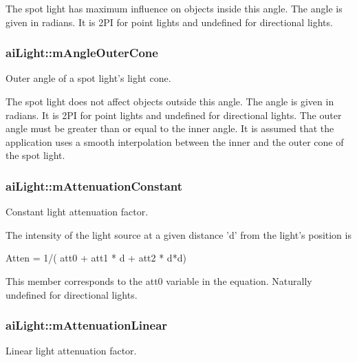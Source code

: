 The spot light has maximum influence on objects inside this angle. The angle is given in radians. It is 2\-P\-I for point lights and undefined for directional lights. \hypertarget{structai_light_a20fd332a5f9d8e8cb94816ff2b0ae7f4}{
\subsubsection[{m\-Angle\-Outer\-Cone}]{ ai\-Light\-::m\-Angle\-Outer\-Cone}}\label{structai_light_a20fd332a5f9d8e8cb94816ff2b0ae7f4}
Outer angle of a spot light's light cone.

The spot light does not affect objects outside this angle. The angle is given in radians. It is 2\-P\-I for point lights and undefined for directional lights. The outer angle must be greater than or equal to the inner angle. It is assumed that the application uses a smooth interpolation between the inner and the outer cone of the spot light. \hypertarget{structai_light_ae8804b3c309527ca0f85d676bab55710}{
\subsubsection[{m\-Attenuation\-Constant}]{ ai\-Light\-::m\-Attenuation\-Constant}}\label{structai_light_ae8804b3c309527ca0f85d676bab55710}
Constant light attenuation factor.

The intensity of the light source at a given distance 'd' from the light's position is 
\begin{DoxyCode}
Atten = 1/( att0 + att1 * d + att2 * d*d)
\end{DoxyCode}
 This member corresponds to the att0 variable in the equation. Naturally undefined for directional lights. \hypertarget{structai_light_aefda311eaa785ea345782dfa95be817c}{
\subsubsection[{m\-Attenuation\-Linear}]{ ai\-Light\-::m\-Attenuation\-Linear}}\label{structai_light_aefda311eaa785ea345782dfa95be817c}
Linear light attenuation factor.

